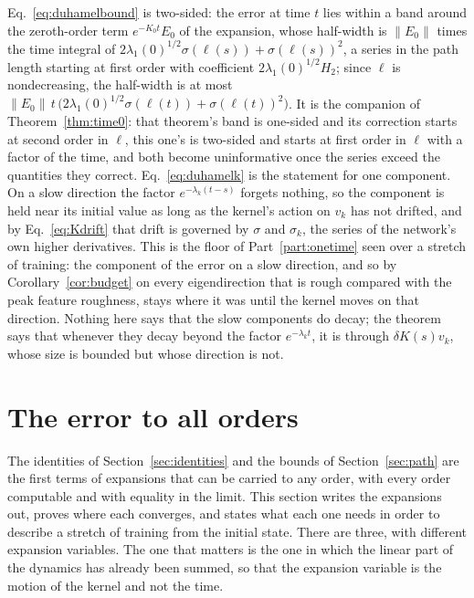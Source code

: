 \documentclass[11pt]{article}
\theoremstyle{definition}
\theoremstyle{remark}
\begin{document}
Eq.~\eqref{eq:duhamelbound} is two-sided: the error at time $t$ lies within a band around the zeroth-order term $e^{-K_0t}E_0$ of the expansion, whose half-width is $\|E_0\|$ times the time integral of $2\lambda_1(0)^{1/2}\sigma(\ell(s)) + \sigma(\ell(s))^2$, a series in the path length starting at first order with coefficient $2\lambda_1(0)^{1/2}H_2$; since $\ell$ is nondecreasing, the half-width is at most $\|E_0\|\,t\,\big(2\lambda_1(0)^{1/2}\sigma(\ell(t)) + \sigma(\ell(t))^2\big)$.
It is the companion of Theorem~\ref{thm:time0}: that theorem's band is one-sided and its correction starts at second order in $\ell$, this one's is two-sided and starts at first order in $\ell$ with a factor of the time, and both become uninformative once the series exceed the quantities they correct.
Eq.~\eqref{eq:duhamelk} is the statement for one component.
On a slow direction the factor $e^{-\lambda_k(t-s)}$ forgets nothing, so the component is held near its initial value as long as the kernel's action on $v_k$ has not drifted, and by Eq.~\eqref{eq:Kdrift} that drift is governed by $\sigma$ and $\sigma_k$, the series of the network's own higher derivatives.
This is the floor of Part~\ref{part:onetime} seen over a stretch of training: the component of the error on a slow direction, and so by Corollary~\ref{cor:budget} on every eigendirection that is rough compared with the peak feature roughness, stays where it was until the kernel moves on that direction.
Nothing here says that the slow components do decay; the theorem says that whenever they decay beyond the factor $e^{-\lambda_kt}$, it is through $\delta K(s)v_k$, whose size is bounded but whose direction is not.

\section{The error to all orders}\label{sec:allorders}

The identities of Section~\ref{sec:identities} and the bounds of Section~\ref{sec:path} are the first terms of expansions that can be carried to any order, with every order computable and with equality in the limit.
This section writes the expansions out, proves where each converges, and states what each one needs in order to describe a stretch of training from the initial state.
There are three, with different expansion variables.
The one that matters is the one in which the linear part of the dynamics has already been summed, so that the expansion variable is the motion of the kernel and not the time.
\end{document}

